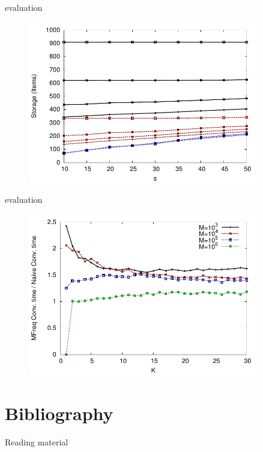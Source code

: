 \begin{frame}{\FreqMF evaluation}

\begin{figure}
\includegraphics[width=0.9\textwidth]{figs/11/msgstorage.pdf}
\end{figure}

\end{frame}

\begin{frame}{\FreqMF evaluation}

\begin{figure}
\includegraphics[width=0.9\textwidth]{figs/11/msgratio.pdf}
\end{figure}

\end{frame}


\section{Bibliography}

\begin{frame}{Reading material}

{\footnotesize
\BIL
\item {}
\item {}
\EIL
}

\invisible{{\tiny

 
}}

\end{frame}

